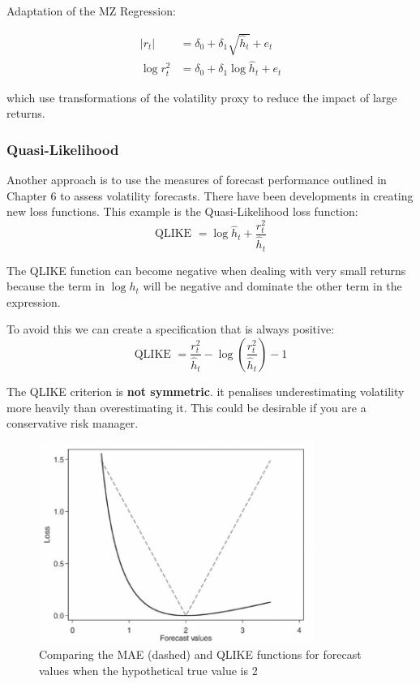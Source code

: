 \documentclass[11pt]{article}
\begin{document}
\begin{example}
    Adaptation of the MZ Regression:

    \begin{equation}
\begin{aligned}
\left|r_t\right| & =\delta_0+\delta_1 \sqrt{\widehat{h}_t}+e_t \\
\log r_t^2 & =\delta_0+\delta_1 \log \widehat{h}_t+e_t
\end{aligned}
\end{equation}

which use transformations of the volatility proxy to reduce the impact of large returns.
\end{example}


\subsubsection{Quasi-Likelihood}

Another approach is to use the measures of forecast performance outlined in Chapter 6 to assess volatility forecasts. There have been developments in creating new loss functions. This example is the Quasi-Likelihood loss function:
\[\text{QLIKE } = \log \hat{h}_t + \dfrac{r_t^2}{\hat{h}_t}\]

\begin{note}
    The QLIKE function can become negative when dealing with very small returns because the term in $\log h_t$ will be negative and dominate the other term in the expression.

    To avoid this we can create a specification that is always positive:
    \[\text{QLIKE } = \dfrac{r_t^2}{\hat{h}_t} - \log \left( \dfrac{r_t^2}{\hat{h}_t}\right) - 1\]
\end{note}

The QLIKE criterion is \textbf{not symmetric}. it penalises underestimating volatility more heavily than overestimating it. This could be desirable if you are a conservative risk manager.

 \begin{figure}
     \centering
     \includegraphics[width=9cm]{pics/QLIKE.png}
     \caption{Comparing the MAE (dashed) and QLIKE functions for forecast values when the hypothetical true value is 2}
     \label{fig:QLIKE}
 \end{figure}
\end{document}

